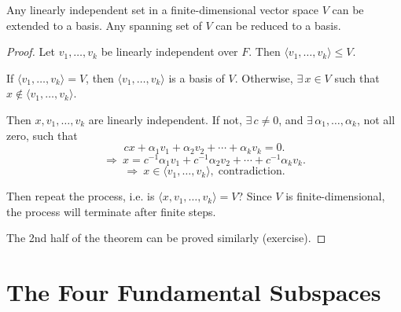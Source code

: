 \newpage

\begin{theorem}[2L]
Any linearly independent set in a finite-dimensional vector space $V$ can be extended to a basis.  
Any spanning set of $V$ can be reduced to a basis.
\end{theorem}

\begin{proof}
Let $v_1, \dots, v_k$ be linearly independent over $F$.  
Then $\langle v_1, \dots, v_k \rangle \le V$.

If $\langle v_1, \dots, v_k \rangle = V$, then $\langle v_1, \dots, v_k \rangle$ is a basis of $V$.  
Otherwise, $\exists\, x \in V$ such that $x \notin \langle v_1, \dots, v_k \rangle$.

Then $x, v_1, \dots, v_k$ are linearly independent.  
If not, $\exists\, c \neq 0$, and $\exists\, \alpha_1, \dots, \alpha_k$, not all zero, such that
\[
c x + \alpha_1 v_1 + \alpha_2 v_2 + \cdots + \alpha_k v_k = 0.
\]
\[
\Rightarrow\ 
x = c^{-1}\alpha_1 v_1 + c^{-1}\alpha_2 v_2 + \cdots + c^{-1}\alpha_k v_k.
\]
\[
\Rightarrow\ x \in \langle v_1, \dots, v_k \rangle, \;\text{contradiction.}
\]

Then repeat the process, i.e. is $\langle x, v_1, \dots, v_k \rangle = V$?  
Since $V$ is finite-dimensional, the process will terminate after finite steps.  

The 2nd half of the theorem can be proved similarly (exercise).
\end{proof}

\section{The Four Fundamental Subspaces}

